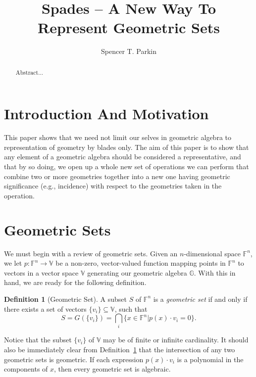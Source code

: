 \documentclass{birkjour}
\theoremstyle{definition}
\newtheorem{defn}[thm]{Definition}
\theoremstyle{remark}
\numberwithin{equation}{section}
\newcommand{\F}{\mathbb{F}}
\newcommand{\G}{\mathbb{G}}
\newcommand{\V}{\mathbb{V}}
\begin{document}
\title{Spades -- A New Way To Represent Geometric Sets}

\author{Spencer T. Parkin}



\begin{abstract}
Abstract...
\end{abstract}


\maketitle

\section{Introduction And Motivation}

This paper shows that we need not limit our selves in geometric algebra to representation of geometry by blades only.
The aim of this paper is to show that any element of a geometric algebra should be considered a representative, and
that by so doing, we open up a whole new set of operations we can perform that combine two or more geometries
together into a new one having geometric significance (e.g., incidence) with respect to the geometries taken in the operation.

\section{Geometric Sets}

We must begin with a review of geometric sets.  Given an $n$-dimensional space $\F^n$, we let $p:\F^n\to\V$ be a non-zero, vector-valued
function mapping points in $\F^n$ to vectors in a vector space $\V$ generating our geometric algebra $\G$.  With this in hand,
we are ready for the following definition.
\begin{defn}[Geometric Set]\label{def_geo_set}
A subset $S$ of $\F^n$ is a \emph{geometric set} if and only if there exists a set of vectors $\{v_i\}\subseteq\V$, such that
\begin{equation}\label{equ_geo_set_def}
S = G(\{v_i\}) = \bigcap_i \{x\in\F^n|p(x)\cdot v_i=0\}.
\end{equation}
\end{defn}
Notice that the subset $\{v_i\}$ of $\V$ may be of finite or infinite cardinality.  It should also be immediately clear
from Definition~\ref{def_geo_set} that the intersection of any two geometric sets is geometric.
If each expression $p(x)\cdot v_i$ is a polynomial in the components of $x$, then every geometric set is algebraic.
\end{document}
